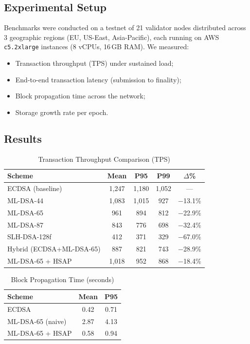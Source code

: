 \documentclass[12pt, a4paper, twocolumn]{article}
\begin{document}
\subsection{Experimental Setup}

Benchmarks were conducted on a testnet of 21 validator nodes distributed across 3 geographic regions (EU, US-East, Asia-Pacific), each running on AWS \texttt{c5.2xlarge} instances (8 vCPUs, 16\,GB RAM). We measured:

\begin{itemize}[noitemsep]
  \item Transaction throughput (TPS) under sustained load;
  \item End-to-end transaction latency (submission to finality);
  \item Block propagation time across the network;
  \item Storage growth rate per epoch.
\end{itemize}

\subsection{Results}

\begin{table}[H]
\centering
\caption{Transaction Throughput Comparison (TPS)}
\label{tab:throughput}
\begin{tabular}{lcccc}
\toprule
\textbf{Scheme} & \textbf{Mean} & \textbf{P95} & \textbf{P99} & \textbf{$\Delta$\%}\\
\midrule
ECDSA (baseline)          & 1,247 & 1,180 & 1,052 & ---   \\
ML-DSA-44                 & 1,083 & 1,015 &   927 & $-$13.1\% \\
ML-DSA-65                 &   961 &   894 &   812 & $-$22.9\% \\
ML-DSA-87                 &   843 &   776 &   698 & $-$32.4\% \\
SLH-DSA-128f              &   412 &   371 &   329 & $-$67.0\% \\
Hybrid (ECDSA+ML-DSA-65)  &   887 &   821 &   743 & $-$28.9\% \\
ML-DSA-65 + HSAP          &   1{,}018 &   952 &   868 & $-$18.4\% \\
\bottomrule
\end{tabular}
\end{table}

\begin{table}[H]
\centering
\caption{Block Propagation Time (seconds)}
\label{tab:propagation}
\begin{tabular}{lcc}
\toprule
\textbf{Scheme} & \textbf{Mean} & \textbf{P95} \\
\midrule
ECDSA                     & 0.42 & 0.71 \\
ML-DSA-65 (naive)         & 2.87 & 4.13 \\
ML-DSA-65 + HSAP          & 0.58 & 0.94 \\
\bottomrule
\end{tabular}
\end{table}
\end{document}
